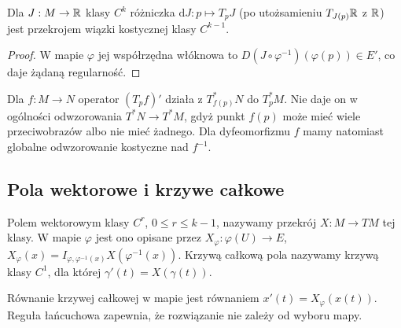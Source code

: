 \begin{wniosek}
\label{cor:fsg-differential-section}
Dla $J:M\to\mathbb R$ klasy $C^k$ różniczka
$\mathrm dJ:p\mapsto T_pJ$ (po utożsamieniu
$T_{J(p)}\mathbb R$ z $\mathbb R$) jest przekrojem wiązki
kostycznej klasy $C^{k-1}$.
\end{wniosek}
\begin{proof}
W mapie $\varphi$ jej współrzędna włóknowa to
$D(J\circ\varphi^{-1})(\varphi(p))\in E'$,
co daje żądaną regularność.
\end{proof}

\begin{uwaga}
\label{rem:fsg-cotangent-pullback}
Dla $f:M\to N$ operator $(T_pf)'$ działa z
$T_{f(p)}^*N$ do $T_p^*M$. Nie daje on w ogólności
odwzorowania $T^*N\to T^*M$, gdyż punkt $f(p)$
może mieć wiele przeciwobrazów albo nie mieć żadnego.
Dla dyfeomorfizmu $f$ mamy natomiast globalne
odwzorowanie kostyczne nad $f^{-1}$.
\end{uwaga}

\subsection{Pola wektorowe i krzywe całkowe}

\begin{definicja}
\label{def:fsg-vector-field}
Polem wektorowym klasy $C^r$, $0\le r\le k-1$,
nazywamy przekrój $X:M\to TM$ tej klasy.
W mapie $\varphi$ jest ono opisane przez
$X_\varphi:\varphi(U)\to E$,
$X_\varphi(x)=I_{\varphi,\varphi^{-1}(x)}
X(\varphi^{-1}(x))$.
Krzywą całkową pola nazywamy krzywą klasy $C^1$,
dla której $\gamma'(t)=X(\gamma(t))$.
\end{definicja}
Równanie krzywej całkowej w mapie jest równaniem
$x'(t)=X_\varphi(x(t))$. Reguła łańcuchowa zapewnia,
że rozwiązanie nie zależy od wyboru mapy.


